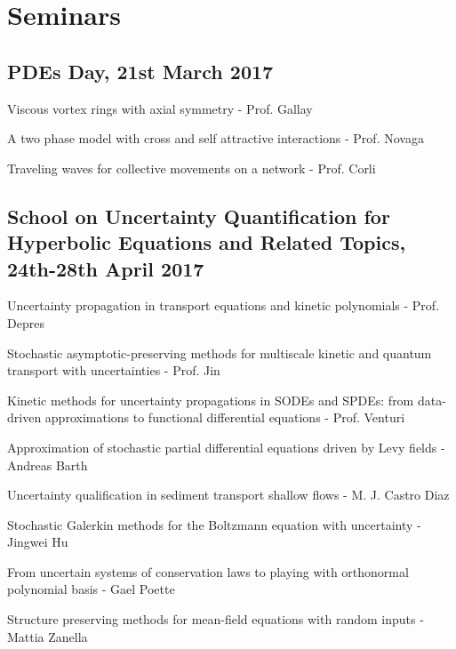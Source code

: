 \documentclass{article}
\begin{document}
\section{Seminars}

\subsection{PDEs Day, 21st March 2017}

\begin{outline}[enumerate]

\1 Viscous vortex rings with axial symmetry - Prof. Gallay

\1A two phase model with cross and self attractive interactions - Prof. Novaga

\1 Traveling waves for collective movements on a network - Prof. Corli

\end{outline}

\subsection{School on Uncertainty Quantification for Hyperbolic Equations and Related Topics, 24th-28th April 2017}

\begin{outline}[enumerate]

\1 Uncertainty propagation in transport equations and kinetic polynomials - Prof. Depres

\1 Stochastic asymptotic-preserving methods for multiscale kinetic and quantum transport with uncertainties - Prof. Jin

\1 Kinetic methods for uncertainty propagations in SODEs and SPDEs: from data-driven approximations to functional differential equations - Prof. Venturi

\1 Approximation of stochastic partial differential equations driven by Levy fields - Andreas Barth

\1 Uncertainty qualification in sediment transport shallow flows - M. J. Castro Diaz

\1 Stochastic Galerkin methods for the Boltzmann equation with uncertainty - Jingwei Hu

\1 From uncertain systems of conservation laws to playing with orthonormal polynomial basis - Gael Poette

\1 Structure preserving methods for mean-field equations with random inputs - Mattia Zanella

\end{outline}
\end{document}
